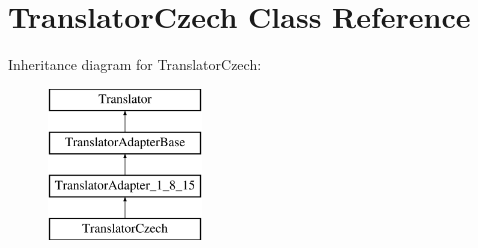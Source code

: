 \hypertarget{class_translator_czech}{}\section{Translator\+Czech Class Reference}
\label{class_translator_czech}
Inheritance diagram for Translator\+Czech\+:\begin{figure}[H]
\begin{center}
\leavevmode
\includegraphics[height=4.000000cm]{class_translator_czech}
\end{center}
\end{figure}
